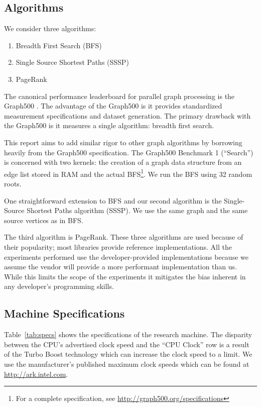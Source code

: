 \documentclass{llncs}
\begin{document}
\subsection{Algorithms}

We consider three algorithms:

\begin{enumerate}
	\item Breadth First Search (BFS)
	\item Single Source Shortest Paths (SSSP)
	\item PageRank
\end{enumerate}

The canonical performance leaderboard for parallel graph processing is the Graph500 \cite{Murphy:2010:Graph500}. The advantage of the Graph500 is it provides standardized measurement specifications and dataset generation. The primary drawback with the Graph500 is it measures a single algorithm: breadth first search.

This report aims to add similar rigor to other graph algorithms by borrowing heavily from the Graph500 specification. The Graph500 Benchmark 1 (``Search'') is concerned with two kernels: the creation of a graph data structure from an edge list stored in RAM and the actual BFS\footnote{For a complete specification, see \url{http://graph500.org/specifications}}. We run the BFS using 32 random roots.

One straightforward extension to BFS and our second algorithm is the Single-Source Shortest Paths algorithm (SSSP). We use the same graph and the same source vertices as in BFS.

The third algorithm is PageRank. These three algorithms are used because of their popularity; most libraries provide reference implementations. All the experiments performed use the developer-provided implementations because we assume the vendor will provide a more performant implementation than us. While this limits the scope of the experiments it mitigates the bias inherent in any developer's programming skills.

\subsection{Machine Specifications}
Table~\ref{tab:specs} shows the specifications of the research machine. The disparity between the CPU's advertised clock speed and the ``CPU Clock'' row is a result of the Turbo Boost technology which can increase the clock speed to a limit. We use the manufacturer's published maximum clock speeds which can be found at \url{http://ark.intel.com}.
\end{document}
